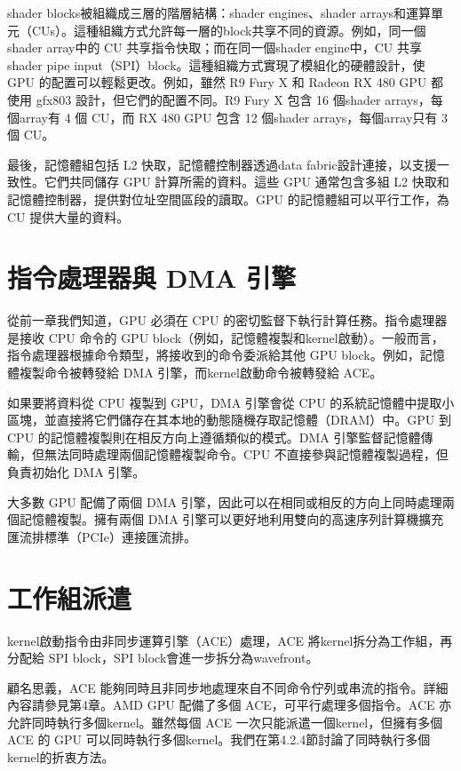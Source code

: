\vspace{1em}
shader blocks被組織成三層的階層結構：shader engines、shader arrays和運算單元（CUs）。這種組織方式允許每一層的block共享不同的資源。例如，同一個shader array中的 CU 共享指令快取；而在同一個shader engine中，CU 共享shader pipe input（SPI）block。這種組織方式實現了模組化的硬體設計，使 GPU 的配置可以輕鬆更改。例如，雖然 R9 Fury X 和 Radeon RX 480 GPU 都使用 gfx803 設計，但它們的配置不同。R9 Fury X 包含 16 個shader arrays，每個array有 4 個 CU，而 RX 480 GPU 包含 12 個shader arrays，每個array只有 3 個 CU。

\vspace{1em}
最後，記憶體組包括 L2 快取，記憶體控制器透過data fabric設計連接，以支援一致性。它們共同儲存 GPU 計算所需的資料。這些 GPU 通常包含多組 L2 快取和記憶體控制器，提供對位址空間區段的讀取。GPU 的記憶體組可以平行工作，為 CU 提供大量的資料。

\section{指令處理器與 DMA 引擎}
從前一章我們知道，GPU 必須在 CPU 的密切監督下執行計算任務。指令處理器是接收 CPU 命令的 GPU block（例如，記憶體複製和kernel啟動）。一般而言，指令處理器根據命令類型，將接收到的命令委派給其他 GPU block。例如，記憶體複製命令被轉發給 DMA 引擎，而kernel啟動命令被轉發給 ACE。

\vspace{1em}
如果要將資料從 CPU 複製到 GPU，DMA 引擎會從 CPU 的系統記憶體中提取小區塊，並直接將它們儲存在其本地的動態隨機存取記憶體（DRAM）中。GPU 到 CPU 的記憶體複製則在相反方向上遵循類似的模式。DMA 引擎監督記憶體傳輸，但無法同時處理兩個記憶體複製命令。CPU 不直接參與記憶體複製過程，但負責初始化 DMA 引擎。

\vspace{1em}
大多數 GPU 配備了兩個 DMA 引擎，因此可以在相同或相反的方向上同時處理兩個記憶體複製。擁有兩個 DMA 引擎可以更好地利用雙向的高速序列計算機擴充匯流排標準（PCIe）連接匯流排。


\section{工作組派遣}
kernel啟動指令由非同步運算引擎（ACE）處理，ACE 將kernel拆分為工作組，再分配給 SPI block，SPI block會進一步拆分為wavefront。

\vspace{1em}
顧名思義，ACE 能夠同時且非同步地處理來自不同命令佇列或串流的指令。詳細內容請參見第4章。AMD GPU 配備了多個 ACE，可平行處理多個指令。ACE 亦允許同時執行多個kernel。雖然每個 ACE 一次只能派遣一個kernel，但擁有多個 ACE 的 GPU 可以同時執行多個kernel。我們在第4.2.4節討論了同時執行多個kernel的折衷方法。

